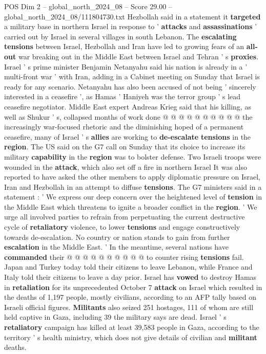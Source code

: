 \begin{textsample}{POS Dim 2 – global\_north\_2024\_08 – Score 29.00 – global\_north\_2024\_08/111804730.txt}
Hezbollah said in a statement it \textbf{targeted} a military base in northern Israel in response to ' \textbf{attacks} and \textbf{assassinations} ' carried out by Israel in several villages in south Lebanon.
The \textbf{escalating} \textbf{tensions} between Israel, Hezbollah and Iran have led to growing fears of an \textbf{all-out} war breaking out in the Middle East between Israel and Tehran ' s \textbf{proxies}.
Israel ' s prime minister Benjamin Netanyahu said his nation is already in a ' multi-front war ' with Iran, adding in a Cabinet meeting on Sunday that Israel is ready for any scenario.
Netanyahu has also been accused of not being ' sincerely interested in a ceasefire ', as Hamas ' Haniyeh was the terror group ' s lead ceasefire negotiator.
Middle East expert Andreas Krieg said that his killing, as well as Shukur ' s, collapsed months of work done @ @ @ @ @ @ @ @ @ @ the increasingly war-focused rhetoric and the diminishing hoped of a permanent ceasefire, many of Israel ' s \textbf{allies} are working to \textbf{de-escalate} \textbf{tensions} in the \textbf{region}.
The US said on the G7 call on Sunday that its choice to increase its military \textbf{capability} in the \textbf{region} was to bolster defense.
Two Israeli troops were wounded in the \textbf{attack}, which also set off a fire in northern Israel It was also reported to have asked the other members to apply diplomatic pressure on Israel, Iran and Hezbollah in an attempt to diffuse \textbf{tensions}.
The G7 ministers said in a statement : ' We express our deep concern over the heightened level of \textbf{tension} in the Middle East which threatens to ignite a broader conflict in the \textbf{region}. ' We urge all involved parties to refrain from perpetuating the current destructive cycle of \textbf{retaliatory} violence, to lower \textbf{tensions} and engage constructively towards de-escalation.
No country or nation stands to gain from further \textbf{escalation} in the Middle East. ' In the meantime, several nations have \textbf{commanded} their @ @ @ @ @ @ @ @ @ @ to counter rising \textbf{tensions} fail.
Japan and Turkey today told their citizens to leave Lebanon, while France and Italy told their citizens to leave a day prior.
Israel has \textbf{vowed} to destroy Hamas in \textbf{retaliation} for its unprecedented October 7 \textbf{attack} on Israel which resulted in the deaths of 1,197 people, mostly civilians, according to an AFP tally based on Israeli official figures. \textbf{Militants} also seized 251 hostages, 111 of whom are still held captive in Gaza, including 39 the military says are dead.
Israel ' s \textbf{retaliatory} campaign has killed at least 39,583 people in Gaza, according to the territory ' s health ministry, which does not give details of civilian and \textbf{militant} deaths.

\end{textsample}
